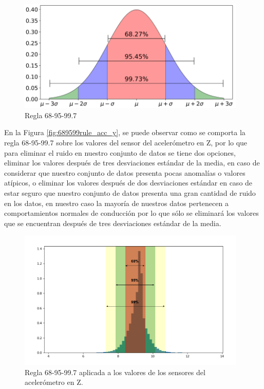 \begin{figure}[h!]
  \begin{center}	\includegraphics[width=0.97\textwidth,frame]{imagenes/Cap3/68-95-99_rule}
  \caption{Regla 68-95-99.7 }
  \label{fig:689599rule}
  \end{center}
\end{figure}

En la Figura \ref{fig:689599rule_acc_y}, se puede observar como se comporta la regla 68-95-99.7 sobre los valores del sensor del aceler\'{o}metro en Z, por lo que para eliminar el ruido en nuestro conjunto de datos se tiene dos opciones, eliminar los valores despu\'{e}s de tres desviaciones est\'{a}ndar de la media, en caso de considerar que nuestro conjunto de datos presenta pocas anomal\'{i}as o valores at\'{i}picos, o eliminar los valores despu\'{e}s de dos desviaciones est\'{a}ndar en caso de estar seguro que nuestro conjunto de datos presenta una gran cantidad de ruido en los datos, en nuestro caso la mayor\'{i}a de nuestros datos pertenecen a comportamientos normales de conducci\'{o}n por lo que s\'{o}lo se eliminar\'{a} los valores que se encuentran despu\'{e}s de tres desviaciones est\'{a}ndar de la media.


\begin{figure}[h!]
  \begin{center}	\includegraphics[width=0.97\textwidth,frame]{imagenes/Cap3/68-95-99_rule_acc_z}
  \caption{Regla 68-95-99.7 aplicada a los valores de los sensores del aceler\'{o}metro en Z. }
  \label{fig:689599rule_acc_z}
  \end{center}
\end{figure}

